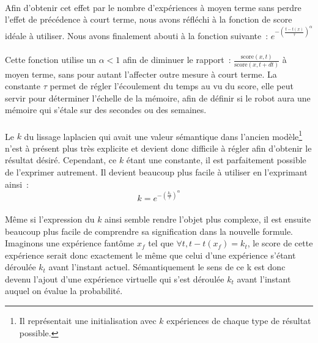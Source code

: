 \paragraph{}
Afin d'obtenir cet effet par le nombre d'expériences à moyen terme sans perdre
l'effet de précédence à court terme, nous avons réfléchi à la fonction de
score idéale à utiliser. Nous avons finalement abouti à la fonction suivante~:
$e^{-(\frac{t-t(x)}{\tau})^{\alpha}}$

\paragraph{}
Cette fonction utilise un $\alpha < 1$ afin de diminuer le rapport~:
$\frac{\mathrm{score}(x,t)}{\mathrm{score}(x, t + dt)}$ à moyen terme, sans
pour autant l'affecter outre mesure à court terme. La constante $\tau$ permet
de régler l'écoulement du temps au vu du score, elle peut servir pour
déterminer l'échelle de la mémoire, afin de définir si le robot aura une
mémoire qui s'étale sur des secondes ou des semaines.


\paragraph{}
Le $k$ du lissage laplacien qui avait une valeur sémantique dans l'ancien
modèle\footnote{Il représentait une initialisation avec $k$ expériences de
chaque type de résultat possible.} n'est à présent plus très explicite et
devient donc difficile à régler afin d'obtenir le résultat désiré. Cependant,
ce $k$ étant une constante, il est parfaitement possible de l'exprimer
autrement. Il devient beaucoup plus facile à utiliser en l'exprimant ainsi~:
$$k = e^{-\left (\frac{k_t}{\tau} \right )^{\alpha}}$$

\paragraph{}
Même si l'expression du $k$ ainsi semble rendre l'objet plus complexe, il est
ensuite beaucoup plus facile de comprendre sa signification dans la nouvelle
formule. Imaginons une expérience fantôme $x_f$ tel que
$\forall t, t - t(x_f) = k_t$, le score de cette expérience serait donc
exactement le même que celui d'une expérience s'étant déroulée $k_t$ avant
l'instant actuel. Sémantiquement le sens de ce k est donc devenu l'ajout d'une
expérience virtuelle qui s'est déroulée $k_t$ avant l'instant auquel on évalue
la probabilité.

